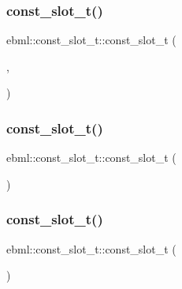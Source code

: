 \subsubsection{\texorpdfstring{const\+\_\+slot\+\_\+t()}{const\_slot\_t()}\hspace{0.1cm}{\footnotesize\ttfamily [1/5]}}
{\footnotesize\ttfamily ebml\+::const\+\_\+slot\+\_\+t\+::const\+\_\+slot\+\_\+t (\begin{DoxyParamCaption}\item[{const \mbox{\hyperlink{namespaceebml_a2deef4e8071531b32e3533f1bf978917}{c\+\_\+ebml\+Element\+\_\+sp}} \&}]{,  }\item[{const \+\_\+slot\+\_\+t \&}]{ }\end{DoxyParamCaption})\hspace{0.3cm}{\ttfamily [protected]}}

\mbox{\label{classebml_1_1const__slot__t_a4aec17cc48cae68d78d65080ca5de7cc}} 
\subsubsection{\texorpdfstring{const\+\_\+slot\+\_\+t()}{const\_slot\_t()}\hspace{0.1cm}{\footnotesize\ttfamily [2/5]}}
{\footnotesize\ttfamily ebml\+::const\+\_\+slot\+\_\+t\+::const\+\_\+slot\+\_\+t (\begin{DoxyParamCaption}\item[{const \mbox{\hyperlink{classebml_1_1slot__t}{slot\+\_\+t}} \&}]{ }\end{DoxyParamCaption})}

\mbox{\label{classebml_1_1const__slot__t_a27268c3669f22a8927bf0463c6a59bea}} 
\subsubsection{\texorpdfstring{const\+\_\+slot\+\_\+t()}{const\_slot\_t()}\hspace{0.1cm}{\footnotesize\ttfamily [3/5]}}
{\footnotesize\ttfamily ebml\+::const\+\_\+slot\+\_\+t\+::const\+\_\+slot\+\_\+t (\begin{DoxyParamCaption}\item[{\mbox{\hyperlink{classebml_1_1slot__t}{slot\+\_\+t}} \&\&}]{ }\end{DoxyParamCaption})}


